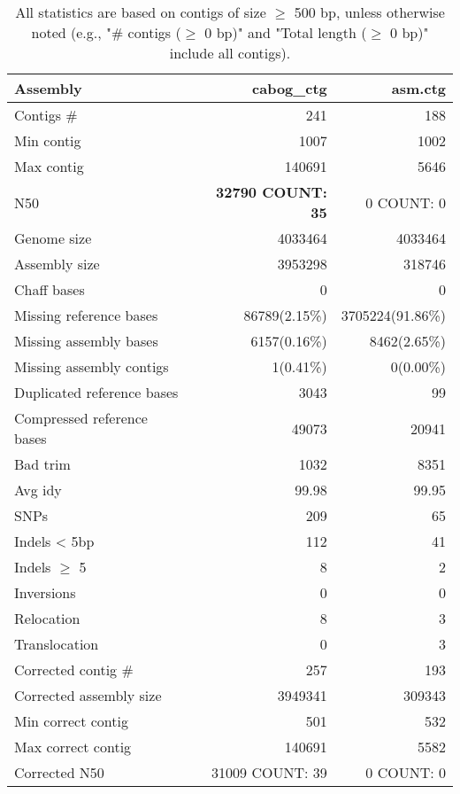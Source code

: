 \documentclass[12pt,a4paper]{article}
\begin{document}
\begin{table}[ht]
\begin{center}
\caption{All statistics are based on contigs of size $\geq$ 500 bp, unless otherwise noted (e.g., "\# contigs ($\geq$ 0 bp)" and "Total length ($\geq$ 0 bp)" include all contigs).}
\begin{tabular}{|l*{2}{|r}|}
\hline
Assembly & cabog\_ctg & asm.ctg \\ \hline
Contigs \# & 241 & 188 \\ \hline
Min contig & 1007 & 1002 \\ \hline
Max contig & 140691 & 5646 \\ \hline
N50 & {\bf 32790 COUNT: 35} & 0 COUNT: 0 \\ \hline
Genome size & 4033464 & 4033464 \\ \hline
Assembly size & 3953298 & 318746 \\ \hline
Chaff bases & 0 & 0 \\ \hline
Missing reference bases & 86789(2.15\%) & 3705224(91.86\%) \\ \hline
Missing assembly bases & 6157(0.16\%) & 8462(2.65\%) \\ \hline
Missing assembly contigs & 1(0.41\%) & 0(0.00\%) \\ \hline
Duplicated reference bases & 3043 & 99 \\ \hline
Compressed reference bases & 49073 & 20941 \\ \hline
Bad trim & 1032 & 8351 \\ \hline
Avg idy & 99.98 & 99.95 \\ \hline
SNPs & 209 & 65 \\ \hline
Indels < 5bp & 112 & 41 \\ \hline
Indels $\geq$ 5 & 8 & 2 \\ \hline
Inversions & 0 & 0 \\ \hline
Relocation & 8 & 3 \\ \hline
Translocation & 0 & 3 \\ \hline
Corrected contig \# & 257 & 193 \\ \hline
Corrected assembly size & 3949341 & 309343 \\ \hline
Min correct contig & 501 & 532 \\ \hline
Max correct contig & 140691 & 5582 \\ \hline
Corrected N50 & 31009 COUNT: 39 & 0 COUNT: 0 \\ \hline
\end{tabular}
\end{center}
\end{table}
\end{document}
